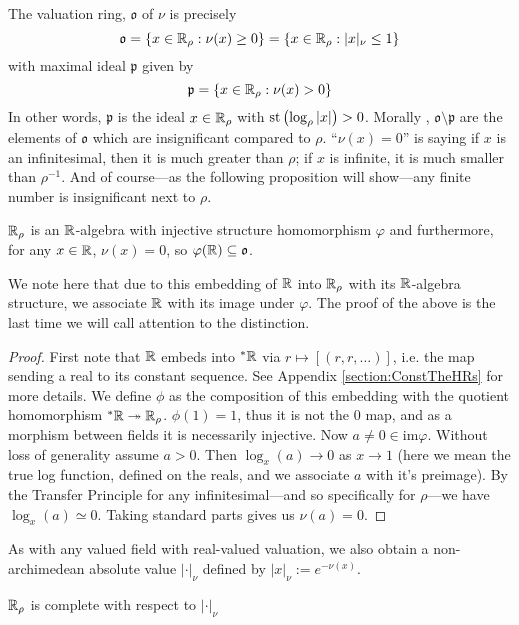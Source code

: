 \documentclass[draft]{amsart}
\DeclareMathOperator{\st}{st}
\begin{document}
    
    The valuation ring, \(\mathfrak{o}\) of \(\nu\) is precisely 
    \[\mathfrak o =\left\{ x\in  \mathbb{R}_\rho  : \nu(x)\ge 0 \right\}=\left\{ x\in  \mathbb{R}_\rho  : |x|_\nu \le 1 \right\}\]
    with maximal ideal \(\mathfrak p\) given by
    \[\mathfrak p = \left\{ x\in \mathfrak  {\mathbb{R}}_\rho  : \nu(x) >0 \right\}\]
    In other words, \(\mathfrak p \) is the ideal \(x\in  \mathbb{R}_\rho \) with \(\st \p{\log_\rho | x |}>0\). Morally , \(\mathfrak o \setminus \mathfrak p\) are the elements of \(\mathfrak o\) which are insignificant compared to \(\rho\). ``\(\nu(x)=0\)'' is saying if \(x\) is an infinitesimal, then it is much greater than \(\rho\); if \(x\) is infinite, it is much smaller than \(\rho^{-1}\). And of course---as the following proposition will show---any finite number is insignificant next to \(\rho\).
    \begin{prop}\label{prop:RAlgebra}
        \(\mathbb{R}_\rho\) is an \(\mathbb{R}\)-algebra with injective structure homomorphism \(\varphi\) and furthermore, for any \(x\in \mathbb{R}\), \(\nu(x)=0\), so \(\varphi(\mathbb{R})\subseteq \mathfrak o \). 
    \end{prop}
    We note here that due to this embedding of \(\mathbb{R}\) into \(\mathbb{R}_\rho\) with its \(\mathbb{R}\)-algebra structure, we associate \(\mathbb{R}\) with its image under \(\varphi\). The proof of the above is the last time we will call attention to the distinction.
    \begin{proof}
        First note that \(\mathbb{R}\) embeds into \(^*\mathbb{R}\) via \(r\mapsto [(r,r,\dots )]\), i.e. the map sending a real to its constant sequence. See Appendix \ref{section:ConstTheHRs} for more details. We define \(\phi\) as the composition of this embedding  with the quotient homomorphism \(^*\mathbb{R} \twoheadrightarrow \mathbb{R}_\rho\). \(\phi(1)=1\), thus it is not the \(0\) map, and as a morphism between fields it is necessarily injective. Now \(a\ne 0\in \mathrm {im} \varphi\). Without loss of generality assume \(a>0\). Then \(\log_x(a)\to 0\) as \(x\to 1\) (here we mean the true log function, defined on the reals, and we associate \(a\) with it's preimage). By the Transfer Principle for any infinitesimal---and so specifically for \(\rho\)---we have \(\log_x(a)\simeq 0 \). Taking standard parts gives us \(\nu(a)=0\).
    \end{proof}
    As with any valued field with real-valued valuation, we also obtain a non-archimedean absolute value \(|\cdot |_\nu\) defined by \(|x |_\nu:=e^{-\nu (x)}\). 
    \begin{thm}\label{thm:completeMetric}
        \(\mathbb{R}_\rho\) is complete with respect to \(|\cdot |_\nu\)
    \end{thm}
\end{document}
